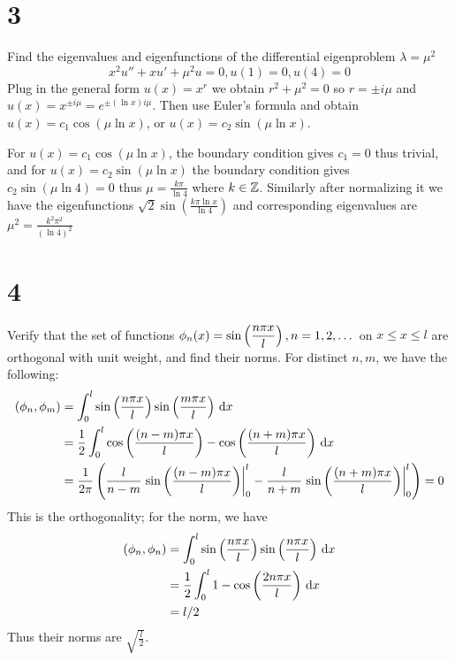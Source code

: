 \documentclass{article}
\begin{document}
\section*{3}
\begin{myleftlinebox}
    Find the eigenvalues and eigenfunctions of the differential eigenproblem \(\lambda=\mu^2\)
    \[x^2 u'' + xu' +\mu^2u = 0, u(1)=0,u(4)=0\]
    \tcbline
    Plug in the general form \(u(x)=x^r\) we obtain \(r^2+\mu^2=0\) so \(r=\pm i\mu\) and \(u(x)=x^{\pm i\mu}=e^{\pm(\ln x)i\mu}\). Then use Euler's formula and obtain
    \(u(x)=c_1\cos(\mu\ln x)\), or \(u(x)=c_2\sin(\mu\ln x)\).

    For \(u(x)=c_1\cos(\mu\ln x)\), the boundary condition gives \(c_1=0\) thus trivial, and for  \(u(x)=c_2\sin(\mu\ln x)\) the boundary condition gives \(c_2 \sin(\mu\ln 4)=0\) thus \(\mu=\frac{k\pi}{\ln 4}\) where \(k\in\mathbb{Z}\). Similarly after normalizing it we have the eigenfunctions \(\sqrt 2\sin(\frac{k\pi\ln x}{\ln 4})\) and corresponding eigenvalues are \(\mu^2=\frac{k^2\pi^2}{(\ln 4)^2}\)
\end{myleftlinebox}

\section*{4}
\begin{myleftlinebox}
    Verify that the set of functions \(\phi_n(x)=\sin\left( \dfrac{n\pi x}{l} \right), n=1,2,\dots\) on \(x\leq x\leq l\) are orthogonal with unit weight, and find their norms.
    \tcbline
    For distinct \(n,m\), we have the following:
    \begin{align*}
        \left( \phi_n,\phi_m \right)&=\int_0^l \sin\left( \frac{n\pi x}{l} \right)\sin\left( \frac{m\pi x}{l} \right)\,\mathrm{d} x\\
        &= \frac{1}{2}\int_0^l \cos\left( \frac{(n-m)\pi x}{l} \right)-\cos\left( \frac{(n+m)\pi x}{l} \right) \,\mathrm{d} x\\
        &= \frac{1}{2\pi}\left( \frac{l}{n-m}\left.\sin\left( \frac{(n-m)\pi x}{l} \right)\right|_0^l-\frac{l}{n+m}\left.\sin\left( \frac{(n+m)\pi x}{l} \right)\right|_0^l \right)=0
    \end{align*}
    This is the orthogonality; for the norm, we have
    \begin{align*}
        \left( \phi_n,\phi_n \right)&=\int_0^l \sin\left( \frac{n\pi x}{l} \right)\sin\left( \frac{n\pi x}{l} \right)\,\mathrm{d} x\\
        &= \frac{1}{2}\int_0^l 1-\cos\left( \frac{2n\pi x}{l} \right)  \,\mathrm{d} x\\
        &= l/2
    \end{align*}
    Thus their norms are \(\sqrt{\frac{l}{2}}\).
\end{myleftlinebox}
\end{document}
